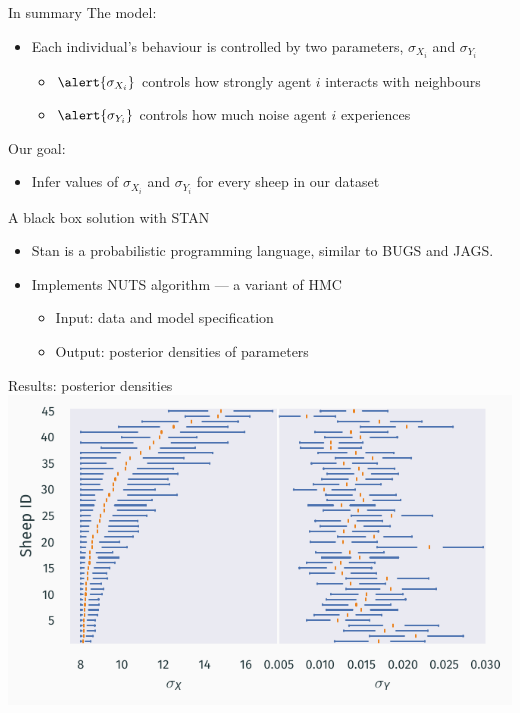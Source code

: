 \documentclass[12pt]{beamer}
\renewcommand{\emph}[1]{{\color{mLightBrown}#1}}
\begin{document}
\begin{frame}{In summary}
  The model:
  \begin{itemize}
    \setlength\itemsep{1em}
    \item Each individual's behaviour is controlled by two parameters, \alert{$\sigma_{X_i}$}
          and \alert{$\sigma_{Y_i}$}
          \begin{itemize}
            \setlength\itemsep{0.3em}
            \item $\alert{\sigma_{X_i}}$ controls how \alert{strongly} agent $i$ \alert{interacts}
                  with neighbours
            \item $\alert{\sigma_{Y_i}}$ controls how much \alert{noise} agent $i$ \alert{experiences}
          \end{itemize}
  \end{itemize}

  Our goal:
  \begin{itemize}
    \setlength\itemsep{1em}
    \item Infer values of $\sigma_{X_i}$ and $\sigma_{Y_i}$ for every sheep in our dataset
  \end{itemize}
\end{frame}

\begin{frame}{A black box solution with STAN}
  \begin{itemize}
    \setlength\itemsep{1em}
    \item Stan is a probabilistic programming language, similar to BUGS and JAGS.
    \item Implements \emph{NUTS} algorithm --- a variant of \emph{HMC}
          \begin{itemize}
            \setlength\itemsep{0.3em}
            \item \alert{Input}: data and model specification
            \item \alert{Output}: posterior densities of parameters
          \end{itemize}
  \end{itemize}
\end{frame}

\begin{frame}{Results: posterior densities}
  \vspace{0.85cm}
  \centering
  \includegraphics{summary_output.pdf}
\end{frame}
\end{document}
